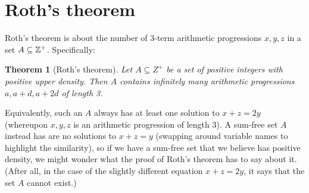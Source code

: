 \documentclass{report}
\newtheorem{theorem}{Theorem}[section]
\theoremstyle{remark}
\numberwithin{equation}{section}
\begin{document}









\section{Roth's theorem}

Roth's theorem is about the number of 3-term arithmetic progressions
$x, y, z$ in a set $A \subseteq \mathbb{Z}^+$.  Specifically: 

\begin{theorem}[Roth's theorem]
  Let $A \subseteq Z^+$ be a set of positive integers with positive
  upper density.  Then $A$ contains infinitely many arithmetic
  progressions $a, a+d, a+2d$ of length 3.  
\end{theorem}

Equivalently, such an $A$ always has at least one solution to $x+z=2y$
(whereupon $x, y, z$ is an arithmetic progression of length $3$).  A
sum-free set $A$ instead has are no solutions to $x+z=y$ (swapping
around variable names to highlight the similarity), so if we have a
sum-free set that we believe has positive density, we might wonder
what the proof of Roth's theorem has to say about it.  (After all, in
the case of the slightly different equation $x+z=2y$, it says that the
set $A$ cannot exist.)
\end{document}
